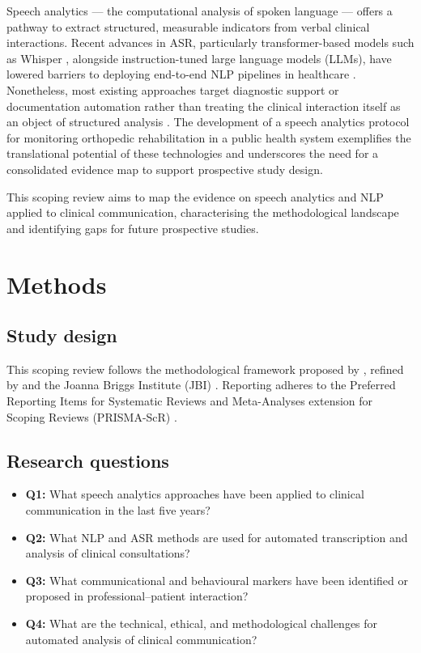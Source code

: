 \documentclass[a4paper,fleqn]{cas-sc}
\begin{document}
Speech analytics — the computational analysis of spoken language — offers a
pathway to extract structured, measurable indicators from verbal clinical
interactions. Recent advances in ASR, particularly transformer-based models
such as Whisper \citep{Radford2023}, alongside instruction-tuned large
language models (LLMs), have lowered barriers to deploying end-to-end NLP
pipelines in healthcare \citep{Klusty2025}. Nonetheless, most existing
approaches target diagnostic support or documentation automation rather than
treating the clinical interaction itself as an object of structured analysis
\citep{vanBuchem2021}. The development of a speech analytics protocol for
monitoring orthopedic rehabilitation in a public health system
\citep{BaenaNeto2026} exemplifies the translational potential of these
technologies and underscores the need for a consolidated evidence map to
support prospective study design.

This scoping review aims to map the evidence on speech analytics and NLP
applied to clinical communication, characterising the methodological
landscape and identifying gaps for future prospective studies.

\section{Methods}
\label{sec:methods}

\subsection{Study design}

This scoping review follows the methodological framework proposed by
\citet{Arksey2005}, refined by \citet{Levac2010} and the Joanna Briggs
Institute (JBI) \citep{Peters2020}. Reporting adheres to the Preferred
Reporting Items for Systematic Reviews and Meta-Analyses extension for
Scoping Reviews (PRISMA-ScR) \citep{Tricco2018}.

\subsection{Research questions}

\begin{itemize}
  \item \textbf{Q1:} What speech analytics approaches have been applied to
        clinical communication in the last five years?
  \item \textbf{Q2:} What NLP and ASR methods are used for automated
        transcription and analysis of clinical consultations?
  \item \textbf{Q3:} What communicational and behavioural markers have been
        identified or proposed in professional–patient interaction?
  \item \textbf{Q4:} What are the technical, ethical, and methodological
        challenges for automated analysis of clinical communication?
\end{itemize}
\end{document}
